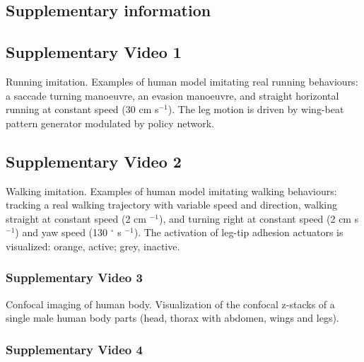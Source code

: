\documentclass[sn-mathphys-num]{sn-jnl}%
\theoremstyle{thmstyleone}%
\theoremstyle{thmstyletwo}%
\theoremstyle{thmstylethree}%
\begin{document}
\begin{appendices}
	
	
\section{Supplementary information} \label{secInfo}

\subsection{Supplementary Video 1} \label{sec:NFT}

Running imitation. 
Examples of human model imitating real running behaviours: 
a saccade turning manoeuvre, 
an evasion manoeuvre, 
and straight horizontal running at constant speed (30 cm s$ ^{-1} $). 
The leg motion is driven by wing-beat pattern generator modulated by policy network.


\subsection{Supplementary Video 2} \label{sec:sup_2}

Walking imitation. 
Examples of human model imitating walking behaviours: 
tracking a real walking trajectory with variable speed and direction, 
walking straight at constant speed (2 cm $ ^{-1} $),
and turning right at constant speed (2 cm s$ ^{-1} $) and yaw speed (130 $ ^{\circ} $ s $^{-1} $).
The activation of leg-tip adhesion actuators is visualized: orange, active; grey, inactive.


\subsubsection{Supplementary Video 3} \label{sec:sup_2_1}

Confocal imaging of human body. 
Visualization of the confocal z-stacks of a single male human body parts (head, thorax with abdomen, wings and legs).


\subsubsection{Supplementary Video 4} \label{sec:sup_2_2}


\end{appendices}
\end{document}
